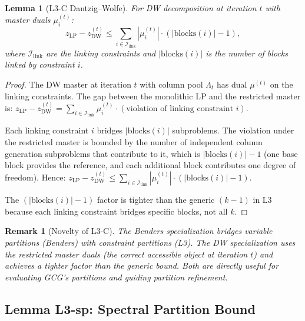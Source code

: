 \documentclass[12pt]{article}
\newtheorem{lemma}[theorem]{Lemma}
\newtheorem{remark}[theorem]{Remark}
\begin{document}
\begin{lemma}[L3-C Dantzig--Wolfe]
\label{lem:L3C-dw}
For DW decomposition at iteration $t$ with master duals $\mu_i^{(t)}$:
\begin{equation}\label{eq:L3C-dw}
  z_{\mathrm{LP}} - z_{\mathrm{DW}}^{(t)} \leq
  \sum_{i \in \mathcal{I}_{\mathrm{link}}} |\mu_i^{(t)}| \cdot (|\mathrm{blocks}(i)| - 1),
\end{equation}
where $\mathcal{I}_{\mathrm{link}}$ are the linking constraints and
$|\mathrm{blocks}(i)|$ is the number of blocks linked by constraint $i$.
\end{lemma}

\begin{proof}
The DW master at iteration $t$ with column pool $\Lambda_t$ has dual
$\mu^{(t)}$ on the linking constraints.  The gap between the monolithic LP
and the restricted master is:
$z_{\mathrm{LP}} - z_{\mathrm{DW}}^{(t)} = \sum_{i \in \mathcal{I}_{\mathrm{link}}} \mu_i^{(t)} \cdot (\text{violation of linking constraint } i)$.

Each linking constraint $i$ bridges $|\mathrm{blocks}(i)|$ subproblems.  The
violation under the restricted master is bounded by the number of
independent column generation subproblems that contribute to it, which is
$|\mathrm{blocks}(i)| - 1$ (one base block provides the reference, and each
additional block contributes one degree of freedom).  Hence:
$z_{\mathrm{LP}} - z_{\mathrm{DW}}^{(t)} \leq \sum_{i \in \mathcal{I}_{\mathrm{link}}} |\mu_i^{(t)}| \cdot (|\mathrm{blocks}(i)| - 1)$.

The $(|\mathrm{blocks}(i)| - 1)$ factor is tighter than the generic $(k-1)$
in L3 because each linking constraint bridges specific blocks, not all $k$.
\end{proof}

\begin{remark}[Novelty of L3-C]
The Benders specialization bridges variable partitions (Benders) with
constraint partitions (L3).  The DW specialization uses the restricted master
duals (the correct accessible object at iteration $t$) and achieves a tighter
factor than the generic bound.  Both are directly useful for evaluating
GCG's partitions and guiding partition refinement.
\end{remark}

\subsection{Lemma L3-sp: Spectral Partition Bound}
\label{sec:L3sp}
\end{document}
